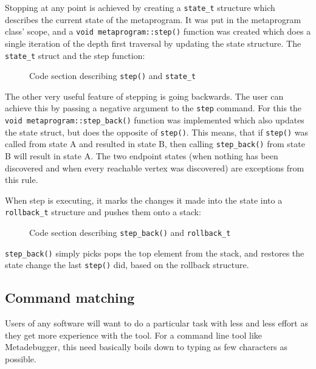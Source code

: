Stopping at any point is achieved by creating a \texttt{state\_t} structure
which describes the current state of the metaprogram. It was put in the
metaprogram class' scope, and a \texttt{void metaprogram::step()} function
was created which does a single iteration of the depth first traversal by
updating the state structure. The \texttt{state\_t} struct and the step
function:

\begin{figure}[H]
    \caption{Code section describing \texttt{step()} and \texttt{state\_t}}
\end{figure}

\noindent
The other very useful feature of stepping is going backwards. The user can
achieve this by passing a negative argument to the \texttt{step} command. For
this the \texttt{void metaprogram::step\_back()} function was implemented which
also updates the state struct, but does the opposite of \texttt{step()}. This
means, that if \texttt{step()} was called from state A and resulted in state
B, then calling \texttt{step\_back()} from state B will result in state A.
The two endpoint states (when nothing has been discovered and when every
reachable vertex was discovered) are exceptions from this rule.

When step is executing, it marks the changes it made into the state into a
\texttt{rollback\_t} structure and pushes them onto a stack:

\begin{figure}[H]
    \caption{Code section describing \texttt{step\_back()} and
        \texttt{rollback\_t}
    }
\end{figure}

\noindent
\texttt{step\_back()} simply picks pops the top element from the stack, and
restores the state change the last \texttt{step()} did, based on the
rollback structure.


\subsection{Command matching}

Users of any software will want to do a particular task with less and less
effort as they get more experience with the tool. For a command line tool like
Metadebugger, this need basically boils down to typing as few characters as
possible.

